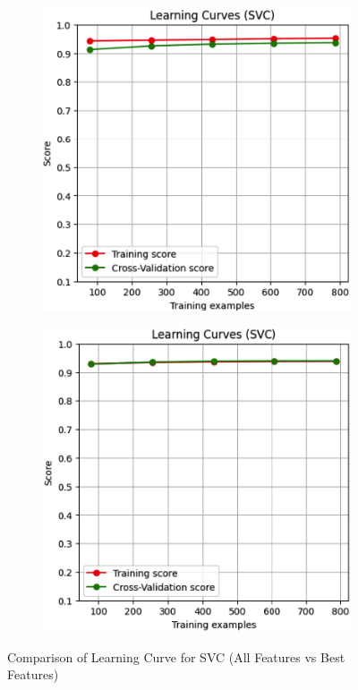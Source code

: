 \documentclass[conference]{IEEEtran}
\begin{document}
\begin{figure}[H]
    \centering
    \begin{subfigure}[b]{0.45\linewidth}
        \centering
        \includegraphics[width=\linewidth]{images/LearningCurveSVCAllFeatures.png}
        \label{fig:learning-curve-all}
    \end{subfigure}
    \hfill
    \begin{subfigure}[b]{0.45\linewidth}
        \centering
        \includegraphics[width=\linewidth]{images/LearningCurveSVCBestFeatures.png}
        \label{fig:learning-curve-best}
    \end{subfigure}
    \caption{Comparison of Learning Curve for SVC (All Features vs Best Features)}
    \label{fig:learning-curve-comparison}
\end{figure}
\end{document}
